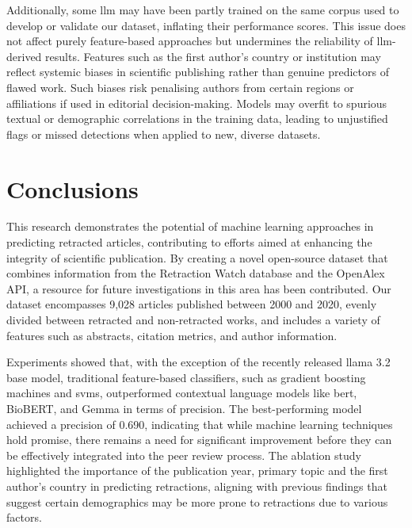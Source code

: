 \documentclass[pdflatex,sn-mathphys-num]{sn-jnl}%
\begin{document}
Additionally, some \gls*{llm} may have been partly trained on the same corpus used to develop or validate our dataset, inflating their performance scores. This issue does not affect purely feature-based approaches but undermines the reliability of \gls*{llm}-derived results. Features such as the first author’s country or institution may reflect systemic biases in scientific publishing rather than genuine predictors of flawed work. Such biases risk penalising authors from certain regions or affiliations if used in editorial decision-making. Models may overfit to spurious textual or demographic correlations in the training data, leading to unjustified flags or missed detections when applied to new, diverse datasets.



\section{Conclusions}
\label{sec:Conclusions}

This research demonstrates the potential of machine learning approaches in predicting retracted articles, contributing to efforts aimed at enhancing the integrity of scientific publication. By creating a novel open-source dataset that combines information from the Retraction Watch database and the OpenAlex API, a resource for future investigations in this area has been contributed. Our dataset encompasses 9,028  articles published between 2000 and 2020, evenly divided between retracted and non-retracted works, and includes a variety of features such as abstracts, citation metrics, and author information.

Experiments showed that, with the exception of the recently released \gls*{llama} 3.2 base model, traditional feature-based classifiers, such as gradient boosting machines and \glspl*{svm}, outperformed contextual language models like \gls*{bert}, BioBERT, and Gemma in terms of precision. The best-performing model achieved a precision of 0.690, indicating that while machine learning techniques hold promise, there remains a need for significant improvement before they can be effectively integrated into the peer review process. The ablation study highlighted the importance of the publication year, primary topic and the first author's country in predicting retractions, aligning with previous findings that suggest certain demographics may be more prone to retractions due to various factors.
\end{document}
